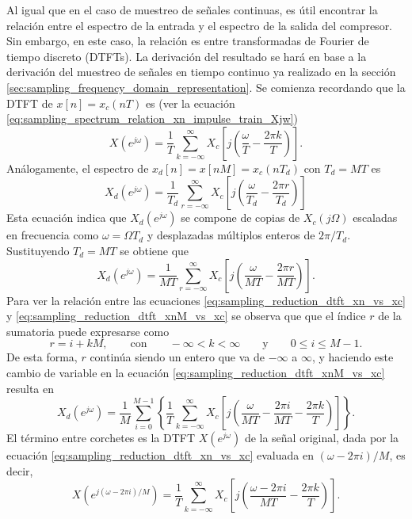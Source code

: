 \documentclass[a4paper]{report}
\begin{document}
Al igual que en el caso de muestreo de señales continuas, es útil encontrar la relación entre el espectro de la entrada y el espectro de la salida del compresor. Sin embargo, en este caso, la relación es entre transformadas de Fourier de tiempo discreto (DTFTs). La derivación del resultado se hará en base a la derivación del muestreo de señales en tiempo continuo ya realizado en la sección \ref{sec:sampling_frequency_domain_representation}. Se comienza recordando que la DTFT de \(x[n]=x_c(nT)\) es (ver la ecuación \ref{eq:sampling_spectrum_relation_xn_impulse_train_Xjw})
\begin{equation}\label{eq:sampling_reduction_dtft_xn_vs_xc}
 X(e^{j\omega})=\frac{1}{T}\sum_{k=-\infty}^{\infty}X_c\left[j\left(\frac{\omega}{T}-\frac{2\pi k}{T}\right)\right]. 
\end{equation}
Análogamente, el espectro de \(x_d[n]=x[nM]=x_c(nT_d)\) con \(T_d=MT\) es
\begin{equation}\label{eq:sampling_reduction_dtft_xn_vs_xc_Td}
 X_d(e^{j\omega})=\frac{1}{T_d}\sum_{r=-\infty}^{\infty}X_c\left[j\left(\frac{\omega}{T_d}-\frac{2\pi r}{T_d}\right)\right] 
\end{equation}
Esta ecuación indica que \(X_d(e^{j\omega})\) se compone de copias de \(X_c(j\Omega)\) escaladas en frecuencia como \(\omega=\Omega T_d\) y desplazadas múltiplos enteros de \(2\pi/T_d\). Sustituyendo \(T_d=MT\) se obtiene que 
\begin{equation}\label{eq:sampling_reduction_dtft_xnM_vs_xc}
 X_d(e^{j\omega})=\frac{1}{MT}\sum_{r=-\infty}^{\infty}X_c\left[j\left(\frac{\omega}{MT}-\frac{2\pi r}{MT}\right)\right].
\end{equation}
Para ver la relación entre las ecuaciones \ref{eq:sampling_reduction_dtft_xn_vs_xc} y \ref{eq:sampling_reduction_dtft_xnM_vs_xc} se observa que que el índice \(r\) de la sumatoria puede expresarse como
\[
 r=i+kM,
 \qquad\textrm{con}\qquad 
 -\infty<k<\infty
 \qquad\textrm{y}\qquad
 0\leq i\leq M-1.
\]
De esta forma, \(r\) continúa siendo un entero que va de \(-\infty\) a \(\infty\), y haciendo este cambio de variable en la ecuación \ref{eq:sampling_reduction_dtft_xnM_vs_xc} resulta en
\[
 X_d(e^{j\omega})=\frac{1}{M}\sum_{i=0}^{M-1}\left\{\frac{1}{T}\sum_{k=-\infty}^{\infty}X_c\left[j\left(\frac{\omega}{MT}-\frac{2\pi i}{MT}-\frac{2\pi k}{T}\right)\right]\right\}.
\]
El término entre corchetes es la DTFT \(X(e^{j\omega})\) de la señal original, dada por la ecuación \ref{eq:sampling_reduction_dtft_xn_vs_xc} evaluada en \((\omega-2\pi i)/M\), es decir,
\[
X(e^{j(\omega-2\pi i)/M})=\frac{1}{T}\sum_{k=-\infty}^{\infty}X_c\left[j\left(\frac{\omega-2\pi i}{MT}-\frac{2\pi k}{T}\right)\right].
\]
\end{document}
